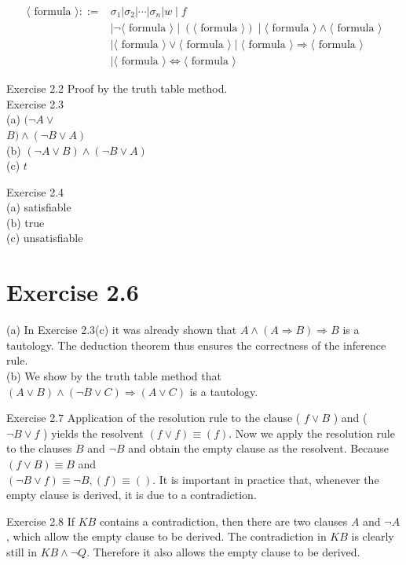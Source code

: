 \documentclass[10pt]{book}
\begin{document}
$$
\begin{aligned}
\langle\text { formula }\rangle::= & \sigma_{1}\left|\sigma_{2}\right| \cdots\left|\sigma_{n}\right| w \mid f \\
& \mid \neg\langle\text { formula }\rangle \mid(\langle\text { formula }\rangle) \mid\langle\text { formula }\rangle \wedge\langle\text { formula }\rangle \\
& \mid\langle\text { formula }\rangle \vee\langle\text { formula }\rangle \mid\langle\text { formula }\rangle \Rightarrow\langle\text { formula }\rangle \\
& \mid\langle\text { formula }\rangle \Leftrightarrow\langle\text { formula }\rangle
\end{aligned}
$$

Exercise 2.2 Proof by the truth table method.\\
Exercise 2.3\\
(a) $(\neg A \vee$\\
$B) \wedge(\neg B \vee A)$\\
(b) $(\neg A \vee B) \wedge(\neg B \vee A)$\\
(c) $t$

Exercise 2.4\\
(a) satisfiable\\
(b) true\\
(c) unsatisfiable

\section*{Exercise 2.6}
(a) In Exercise 2.3(c) it was already shown that $A \wedge(A \Rightarrow B) \Rightarrow B$ is a tautology. The deduction theorem thus ensures the correctness of the inference rule.\\
(b) We show by the truth table method that $(A \vee B) \wedge(\neg B \vee C) \Rightarrow(A \vee C)$ is a tautology.

Exercise 2.7 Application of the resolution rule to the clause ( $f \vee B$ ) and ( $\neg B \vee f$ ) yields the resolvent $(f \vee f) \equiv(f)$. Now we apply the resolution rule to the clauses $B$ and $\neg B$ and obtain the empty clause as the resolvent. Because $(f \vee B) \equiv B$ and\\
$(\neg B \vee f) \equiv \neg B,(f) \equiv()$. It is important in practice that, whenever the empty clause is derived, it is due to a contradiction.


Exercise 2.8 If $K B$ contains a contradiction, then there are two clauses $A$ and $\neg A$, which allow the empty clause to be derived. The contradiction in $K B$ is clearly still in $K B \wedge \neg Q$. Therefore it also allows the empty clause to be derived.
\end{document}
